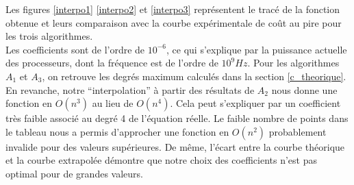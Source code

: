 Les figures \ref{interpo1} \ref{interpo2} et \ref{interpo3} représentent le tracé de la fonction obtenue et leurs comparaison avec la courbe expérimentale de coût au pire pour les trois algorithmes.\\
Les coefficients sont de l'ordre de $10^{-6}$, ce qui s'explique par la puissance actuelle des processeurs, dont la fréquence est de l'ordre de $10^9Hz$. Pour les algorithmes $A_1$ et $A_3$, on retrouve les degrés maximum calculés dans la section \ref{c_theorique}.\\
En revanche, notre ``interpolation'' à partir des résultats de $A_2$ nous donne une fonction en $O(n^3)$ au lieu de $O(n^4)$. Cela peut s'expliquer par un coefficient très faible associé au degré 4 de l'équation réelle. 
Le faible nombre de points dans le tableau nous a permis d'approcher une fonction en $O(n^2)$ probablement invalide pour des valeurs supérieures. De même, l'écart entre la courbe théorique et la courbe extrapolée démontre que notre choix des coefficients n'est pas optimal pour de grandes valeurs.